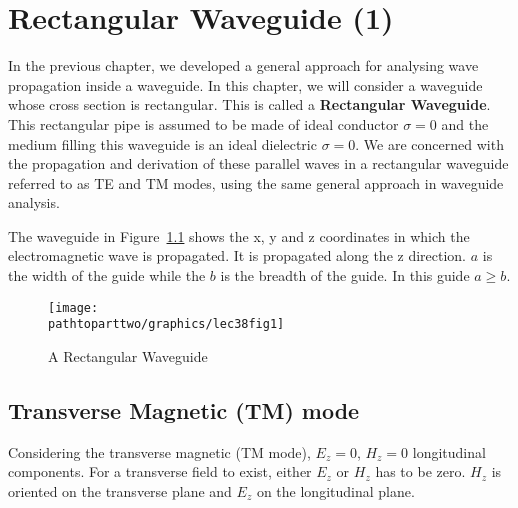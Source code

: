 \chapter{Rectangular Waveguide (1)}
In the previous chapter, we developed a general approach for analysing wave propagation inside a waveguide. In this chapter, we will consider a waveguide whose cross section is rectangular. This is called a \textbf{Rectangular Waveguide}. This rectangular pipe is assumed to be made of ideal conductor $\sigma = 0$ and the medium filling this waveguide is an ideal dielectric $\sigma = 0$. We are concerned with the propagation and derivation of these parallel waves in a rectangular waveguide referred to as TE and TM modes, using the same general approach in waveguide analysis.

The waveguide in Figure~\ref{fig:lec38fig1} shows the x, y and z coordinates in which the electromagnetic wave is propagated. It is propagated along the z direction. $a$ is the width of the guide while the $b$ is the breadth of the guide. In this guide $a \geq b$.

\begin{figure}[h]
\centering
\texttt{[image: \\pathtoparttwo/graphics/lec38fig1]}
\caption{A Rectangular Waveguide}
\label{fig:lec38fig1}
\end{figure}

\section{Transverse Magnetic (TM) mode}
Considering the transverse magnetic (TM mode), $ E_{z} = 0$, $H_{z} = 0 $ longitudinal components. For a transverse field to exist, either $ E_{z} $ or $ H_{z} $ has to be zero. $ H_{z} $ is oriented on the transverse plane and $ E_{z} $ on the longitudinal plane.

